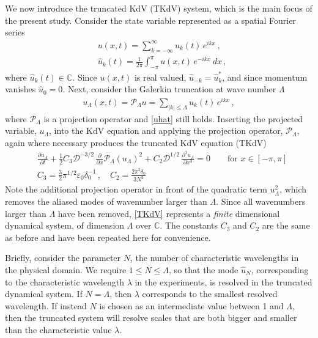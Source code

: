 \documentclass[11pt]{article}
\newcommand{\pd}[2]    { \frac{\partial #1} {\partial #2} }
\newcommand{\abs}[1]{\left| #1 \right|}
\newcommand{\eps}{\varepsilon}
\newcommand{\dx}{\, dx}
\newcommand{\lam}{\lambda}
\newcommand{\lamfac}{N}
\newcommand{\drat}{\mathcal{D}}
\newcommand{\epsup}{\eps_0}
\newcommand{\delup}{\delta_0}
\newcommand{\uhat}{\hat{u}}
\newcommand{\Proj}{\mathcal{P}_{\Lambda}}
\newcommand{\uL}{u_{\Lambda}}
\begin{document}
We now introduce the truncated KdV (TKdV) system, which is the main focus of the present study. Consider the state variable represented as a spatial Fourier series
\begin{align}
&u(x,t) = \sum_{k=-\infty}^{\infty} \uhat_k(t) \, e^{i k x} \, , \\
\label{uhat}
&\uhat_k(t) = \frac{1}{2 \pi} \int_{-\pi}^{\pi} u(x,t) \, e^{-i k x} \dx \, ,
\end{align}
where $\uhat_k(t) \in \mathbb{C}$. Since $u(x,t)$ is real valued, $\uhat_{-k} = \uhat_{k}^*$, and since momentum vanishes $\uhat_0 = 0$.
Next, consider the Galerkin truncation at wave number $\Lambda$
\begin{align}
\uL(x,t) = \Proj u =
\sum_{\abs{k} \le \Lambda} \uhat_k(t) \, e^{i k x} \, ,
\end{align}
where $\Proj$ is a projection operator and \eqref{uhat} still holds. Inserting the projected variable, $\uL$, into the KdV equation and applying the projection operator, $\Proj$, again where necessary produces the truncated KdV equation (TKdV)
\begin{align}
\label{TKdV}
&\pd{\uL}{t} +  \frac{1}{2} C_3 \drat^{-3/2} \, \pd{}{x} \Proj (\uL)^2 + C_2 \drat^{1/2} \, \frac{\partial^3 \uL}{\partial x^3} = 0
\qquad \text{for } x \in [-\pi,\pi] \\
&C_3 = \frac{3}{2} \pi^{1/2} \epsup \delup^{-1} \, , \quad C_2 = \frac{2 \pi^2 \delup}{3 \lamfac^2}
\end{align}
Note the additional projection operator in front of the quadratic term $\uL^2$, which removes the aliased modes of wavenumber larger than $\Lambda$. Since all wavenumbers larger than $\Lambda$ have been removed, \eqref{TKdV} represents a {\em finite} dimensional dynamical system, of dimension $\Lambda$ over $\mathbb{C}$. The constants $C_3$ and $C_2$ are the same as before and have been repeated here for convenience. 

Briefly, consider the parameter $\lamfac$, the number of characteristic wavelengths in the physical domain. We require $1 \le \lamfac \le \Lambda$, so that the mode $\uhat_{\lamfac}$, corresponding to the characteristic wavelength $\lam$ in the experiments, is resolved in the truncated dynamical system. If $\lamfac = \Lambda$, then $\lam$ corresponds to the smallest resolved wavelength. If instead $\lamfac$ is chosen as an intermediate value between 1 and $\Lambda$, then the truncated system will resolve scales that are both bigger and smaller than the characteristic value $\lam$.
\end{document}
